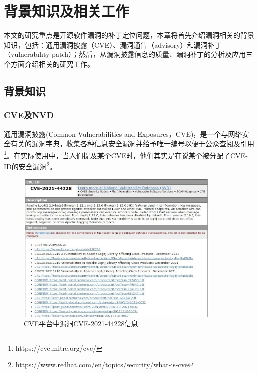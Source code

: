 \chapter{背景知识及相关工作}
本文的研究重点是开源软件漏洞的补丁定位问题，本章将首先介绍漏洞相关的背景知识，包括：通用漏洞披露（CVE）、漏洞通告（advisory）和漏洞补丁（vulnerability patch）；然后，从漏洞披露信息的质量、漏洞补丁的分析及应用三个方面介绍相关的研究工作。


\section{背景知识}

\subsection{CVE及NVD} 
通用漏洞披露(Common Vulnerabilities and Exposures，CVE)\cite{mitre2021:cve}，是一个与网络安全有关的漏洞字典，收集各种信息安全漏洞并给予唯一编号以便于公众查阅及引用\footnote{https://cve.mitre.org/cve/}。在实际使用中，当人们提及某个CVE时，他们其实是在说某个被分配了CVE-ID的安全漏洞\footnote{https://www.redhat.com/en/topics/security/what-is-cve}。
\begin{figure}[h]
    \centering
    \includegraphics[width=0.88\textwidth]{fig/CVE-2021-44228-2}
    \caption{CVE平台中漏洞CVE-2021-44228信息}
    \label{fig:CVE-2021-44228}
\end{figure}

